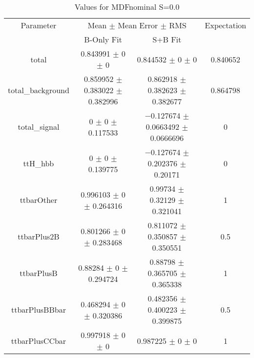\begin{table}
\centering
\caption{Values for MDFnominal S=0.0}
\begin{tabular}{cccc}
\toprule
Parameter & \multicolumn{2}{c}{Mean $\pm$ Mean Error $\pm$ RMS} & Expectation\\
 & B-Only Fit & S+B Fit & \\
\midrule
total & \num{0.843991} $\pm$ \num{0} $\pm$ \num{0} & \num{0.844532} $\pm$ \num{0} $\pm$ \num{0} & \num{0.840652}\\
total\_background & \num{0.859952} $\pm$ \num{0.383022} $\pm$ \num{0.382996} & \num{0.862918} $\pm$ \num{0.382623} $\pm$ \num{0.382677} & \num{0.864798}\\
total\_signal & \num{0} $\pm$ \num{0} $\pm$ \num{0.117533} & \num{-0.127674} $\pm$ \num{0.0663492} $\pm$ \num{0.0666696} & \num{0}\\
ttH\_hbb & \num{0} $\pm$ \num{0} $\pm$ \num{0.139775} & \num{-0.127674} $\pm$ \num{0.202376} $\pm$ \num{0.20171} & \num{0}\\
ttbarOther & \num{0.996103} $\pm$ \num{0} $\pm$ \num{0.264316} & \num{0.99734} $\pm$ \num{0.32129} $\pm$ \num{0.321041} & \num{1}\\
ttbarPlus2B & \num{0.801266} $\pm$ \num{0} $\pm$ \num{0.283468} & \num{0.811072} $\pm$ \num{0.350857} $\pm$ \num{0.350551} & \num{0.5}\\
ttbarPlusB & \num{0.88284} $\pm$ \num{0} $\pm$ \num{0.294724} & \num{0.88798} $\pm$ \num{0.365705} $\pm$ \num{0.365338} & \num{1}\\
ttbarPlusBBbar & \num{0.468294} $\pm$ \num{0} $\pm$ \num{0.320386} & \num{0.482356} $\pm$ \num{0.400223} $\pm$ \num{0.399875} & \num{0.5}\\
ttbarPlusCCbar & \num{0.997918} $\pm$ \num{0} $\pm$ \num{0} & \num{0.987225} $\pm$ \num{0} $\pm$ \num{0} & \num{1}\\
\bottomrule
\end{tabular}
\end{table}